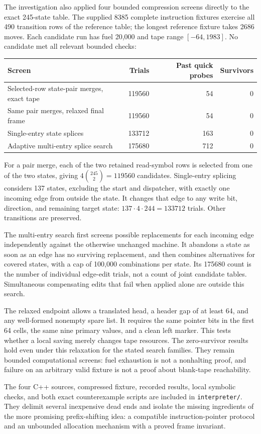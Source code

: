 The investigation also applied four bounded compression screens directly
to the exact 245-state table.  The supplied 8385 complete instruction
fixtures exercise all 490 transition rows of the reference table; the
longest reference fixture takes 2686 moves.  Each candidate run has fuel
20,000 and tape range $[-64,1983]$.  No candidate met all relevant
bounded checks:
\begin{center}
\begin{tabular}{l|r|r|r}
Screen & Trials & Past quick probes & Survivors\\
\hline
Selected-row state-pair merges, exact tape & 119560 & 54 & 0\\
Same pair merges, relaxed final frame & 119560 & 54 & 0\\
Single-entry state splices & 133712 & 163 & 0\\
Adaptive multi-entry splice search & 175680 & 712 & 0
\end{tabular}
\end{center}
For a pair merge, each of the two retained read-symbol rows is selected
from one of the two states, giving
$4\binom{245}{2}=119560$ candidates.  Single-entry splicing considers
137 states, excluding the start and dispatcher, with exactly one incoming
edge from outside the state.  It changes that edge to any write bit,
direction, and remaining target state: $137\cdot4\cdot244=133712$
trials.  Other transitions are preserved.

The multi-entry search first screens possible replacements for each
incoming edge independently against the otherwise unchanged machine.
It abandons a state as soon as an edge has no surviving replacement, and
then combines alternatives for covered states, with a cap of 100,000
combinations per state.  Its 175680 count is the number of individual
edge-edit trials, not a count of joint candidate tables.  Simultaneous
compensating edits that fail when applied alone are outside this search.

The relaxed endpoint allows a translated head, a header gap of at least
64, and any well-formed nonempty spare list.  It requires the same pointer
bits in the first 64 cells, the same nine primary values, and a clean
left marker.  This tests whether a local saving merely changes tape
resources.  The zero-survivor results hold even under this relaxation
for the stated search families.  They remain bounded computational
screens: fuel exhaustion is not a nonhalting proof, and failure on an
arbitrary valid fixture is not a proof about blank-tape reachability.

The four C++ sources, compressed fixture, recorded results, local symbolic
checks, and both exact counterexample scripts are included in
\texttt{interpreter/}.  They delimit several inexpensive dead ends and
isolate the missing ingredients of the more promising prefix-shifting
idea: a compatible instruction-pointer protocol and an unbounded
allocation mechanism with a proved frame invariant.
